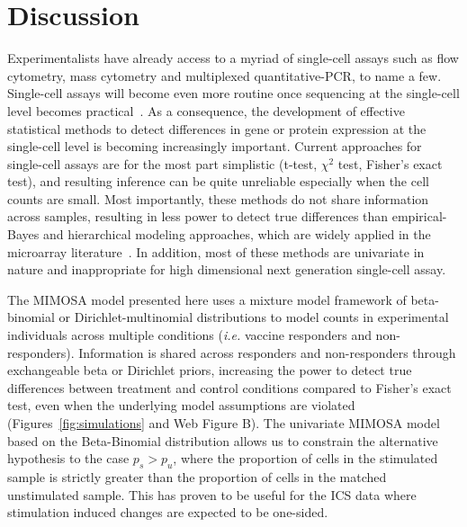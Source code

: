 \documentclass[useAMS,referee,usenatbib]{biom}
\begin{document}
\section{Discussion}
\label{s:discussion}
Experimentalists have already access to a myriad of single-cell assays such as flow cytometry, mass cytometry and multiplexed quantitative-PCR, to name a few. Single-cell assays will become even more routine once sequencing at the single-cell level becomes practical~\citep{Ramskold:2012gj}. As a consequence, the development of effective statistical methods to detect differences in gene or protein expression at the single-cell level is becoming increasingly important. Current approaches for single-cell assays are for the most part simplistic (t-test, $\chi^2$ test, Fisher's exact test), and resulting inference can be quite unreliable especially when the cell counts are small. Most importantly, these methods do not share information across samples, resulting in less power to detect true differences than empirical-Bayes and hierarchical modeling approaches, which are widely applied in the microarray literature~\citep{Kendziorski:2003uw,Newton:2001go,Smyth:2005iy}. In addition, most of these methods are univariate in nature and inappropriate for high dimensional next generation single-cell assay.

The MIMOSA model presented here uses a mixture model framework of beta-binomial or Dirichlet-multinomial distributions to model counts in experimental individuals across multiple conditions (\textit{i.e.} vaccine responders and non-responders). Information is shared across responders and non-responders through exchangeable beta or Dirichlet priors, increasing the power to detect true differences between treatment and control conditions compared to Fisher's exact test, even when the underlying model assumptions are violated (Figures~\ref{fig:simulations} and Web Figure B). The univariate MIMOSA model based on the Beta-Binomial distribution allows us to constrain the alternative hypothesis to the case $p_s > p_u$, where the proportion of cells in the stimulated sample is strictly greater than the proportion of cells in the matched unstimulated sample. This has proven to be useful for the ICS data where stimulation induced changes are expected to be one-sided.
\end{document}

